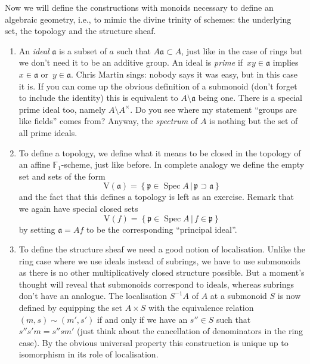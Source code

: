 Now we will define the constructions with monoids necessary to define an algebraic geometry, i.e., to mimic the divine trinity of schemes: the underlying set, the topology and the structure sheaf.
\begin{enumerate}
  \item An \emph{ideal} $\mathfrak{a}$ is a subset of $a$ such that $A\mathfrak{a}\subset A$, just like in the case of rings but we don't need it to be an additive group. An ideal is \emph{prime} if~$xy\in\mathfrak{a}$ implies $x\in\mathfrak{a}$ or~$y\in\mathfrak{a}$. Chris Martin sings: nobody says it was easy, but in this case it is. If you can come up the obvious definition of a submonoid (don't forget to include the identity) this is equivalent to $A\setminus\mathfrak{a}$ being one. There is a special prime ideal too, namely $A\setminus A^\times$. Do you see where my statement ``groups are like fields'' comes from? Anyway, the \emph{spectrum} of $A$ is nothing but the set of all prime ideals.

  \item To define a topology, we define what it means to be closed in the topology of an affine $\mathbb{F}_1$-scheme, just like before. In complete analogy we define the empty set and sets of the form
    \begin{equation}
      \mathrm{V}(\mathfrak{a})=\left\{ \mathfrak{p}\in\operatorname{Spec}A\,|\,\mathfrak{p}\supset\mathfrak{a} \right\}
    \end{equation}
    and the fact that this defines a topology is left as an exercise. Remark that we again have special closed sets
    \begin{equation}
      \mathrm{V}(f)=\left\{ \mathfrak{p}\in\operatorname{Spec}A\,|\,f\in\mathfrak{p} \right\}
    \end{equation}
    by setting $\mathfrak{a}=Af$ to be the corresponding ``principal ideal''.


  \item To define the structure sheaf we need a good notion of localisation. Unlike the ring case where we use ideals instead of subrings, we have to use submonoids as there is no other multiplicatively closed structure possible. But a moment's thought will reveal that submonoids correspond to ideals, whereas subrings don't have an analogue. The localisation $S^{-1}A$ of $A$ at a submonoid $S$ is now defined by equipping the set $A\times S$ with the equivalence relation $(m,s)\sim(m',s')$ if and only if we have an $s''\in S$ such that $s''s'm=s''sm'$ (just think about the cancellation of denominators in the ring case). By the obvious universal property this construction is unique up to isomorphism in its role of localisation.


\end{enumerate}
